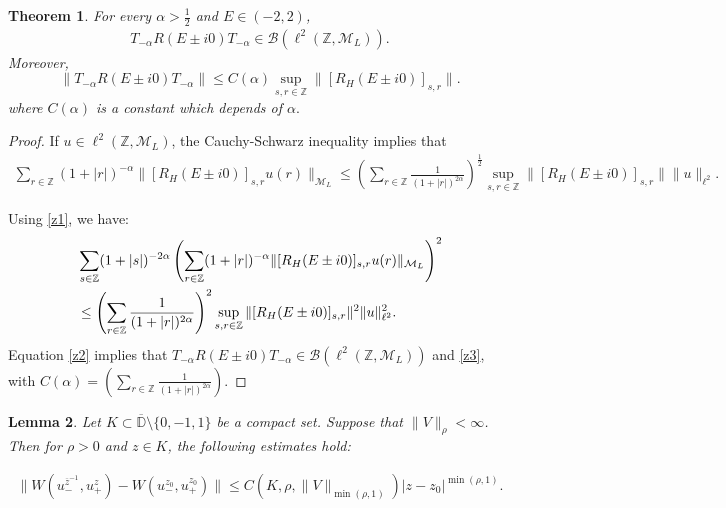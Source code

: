 \documentclass[12pt,oneside,onecolumn,open]{article}
\newtheorem{teo}{Theorem}[section]
\newtheorem{lema}[teo]{Lemma}
\begin{document}
\begin{teo}\label{teoaco} For every \(\alpha > \frac{1}{2}\) and \(E\in(-2,2)\), 
\begin{align}\label{i4}
    T_{-\alpha}R(E\pm i0)T_{-\alpha }\in\mathcal{B}(\ell ^{2}(\mathbb{Z},\mathcal{M}_L)).
\end{align}
Moreover, 
\begin{equation} \label{z3}\|T_{-\alpha }R(E\pm i0)T_{-\alpha }\|\leq C(\alpha )\sup_{s,r\in\mathbb{Z}}\|[R_H(E\pm i0)]_{s,r}\|.\end{equation} where $C(\alpha )$ is a constant which depends of $\alpha .$
\end{teo}
\begin{proof}
If \(u\in \ell ^{2}(\mathbb{Z},\mathcal{M}_L)\), the Cauchy-Schwarz inequality implies that
\begin{align}\label{z1}
\sum_{r\in\mathbb{Z}}(1+|r|)^{-\alpha }\|[R_H(E\pm i0)]_{s,r}u(r)\|_{\mathcal{M}_L}\leq \left(\sum_{r\in\mathbb{Z}}\frac{1}{(1+|r|)^{2\alpha }}\right)^{\frac{1}{2}}\sup_{s,r\in\mathbb{Z}}\|[R_H(E\pm i0)]_{s,r}\|\|u\|_{\ell ^{2}}.
\end{align}

Using \eqref{z1}, we have:
\begin{align}\label{z2}
&\sum_{s\in\mathbb{Z}}(1+|s|)^{-2\alpha }\left(\sum_{r\in\mathbb{Z}}(1+|r|)^{-\alpha }\|[R_H(E\pm i0)]_{s,r}u(r)\|_{\mathcal{M}_L}\right)^{2} \\&\notag\leq \left(\sum_{r\in\mathbb{Z}}\frac{1}{(1+|r|)^{2\alpha }}\right)^{2}\sup_{s,r\in\mathbb{Z}}\|[R_H(E\pm i0)]_{s,r}\|^{2}\|u\|_{\ell ^{2}}^{2}.
\end{align}
Equation \eqref{z2} implies that \(T_{-\alpha }R(E\pm i0)T_{-\alpha }\in\mathcal{B}(\ell ^{2}(\mathbb{Z},\mathcal{M}_L))\) and \eqref{z3}, with 
$  C(\alpha)=\left(\sum_{r\in\mathbb{Z}}\frac{1}{(1+|r|)^{2\alpha }}\right). $


\color{black}



\end{proof}
\color{black}
\begin{lema}\label{y11}
   Let $K \subset \overline{ \mathbb{D}} \setminus  \{0, -1,  1\} $ be a compact set. %
  Suppose that $ \|  V \|
  _{\rho} < \infty $. Then for $\rho > 0$ and $z \in K$, the following estimates hold:     
     
     \begin{align}\label{i5}
         \|W(u_-^{\overline{z}^{-1}}, u_+^{z})-W(u_-^{z_0}, u_{+}^{z_0})\|\leq C(K, \rho, \|  V\| _{\min(\rho, 1 )})   | z- z_0|^{\min(\rho, 1)} .
     \end{align}
\end{lema}
\end{document}
